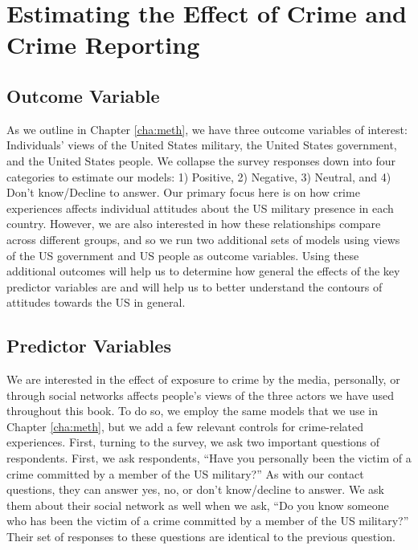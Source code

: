
\section*{Estimating the Effect of Crime and Crime Reporting}


\subsection*{Outcome Variable}
As we outline in Chapter \ref{cha:meth}, we have three outcome variables of interest: Individuals' views of the United States military, the United States government, and the United States people. We collapse the survey responses down into four categories to estimate our models: 1) Positive, 2) Negative, 3) Neutral, and 4) Don't know/Decline to answer. Our primary focus here is on how crime experiences affects individual attitudes about the US military presence  in each country. However, we are also interested in how these relationships compare across different groups, and so we run two additional sets of models using views of the US government and US people as outcome variables. Using these additional outcomes will help us to determine how general the effects of the key predictor variables are and will help us to better understand the contours of attitudes towards the US in general. 

\subsection*{Predictor Variables}

We are interested in the effect of exposure to crime by the media, personally, or through social networks affects people's views of the three actors we have used throughout this book. To do so, we employ the same models that we use in Chapter \ref{cha:meth}, but we add a few relevant controls for crime-related experiences. First, turning to the survey, we ask two important questions of respondents. First, we ask respondents, ``Have you personally been the victim of a crime committed by a member of the US military?'' As with our contact questions, they can answer yes, no, or don't know/decline to answer. We ask them about their social network as well when we ask, ``Do you know someone who has been the victim of a crime committed by a member of the US military?'' Their set of responses to these questions are identical to the previous question.

